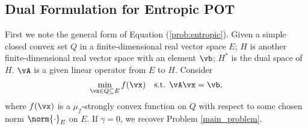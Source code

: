 \subsection{Dual Formulation for Entropic POT}
First we note the general form of Equation (\ref{prob:entropic}). Given a simple closed convex set $Q$ in a finite-dimensional real vector space $E$; $H$ is another finite-dimensional real vector space with an element $\vb$; $H^\ast$ is the dual space of $H$. $\vA$ is a given linear operator from $E$ to $H$. Consider
\begin{equation} \label{general_problem}
    \min_{\vx \in Q \subseteq E} f(\vx) \quad \text{s.t. }  \vA \vx = \vb,
\end{equation}
where $f(\vx)$ is a $\mu_f$-strongly convex function on $Q$ with respect to some chosen norm $\norm{\cdot}_E$ on $E$. If $\gamma = 0$, we recover Problem \eqref{main_problem}. 

